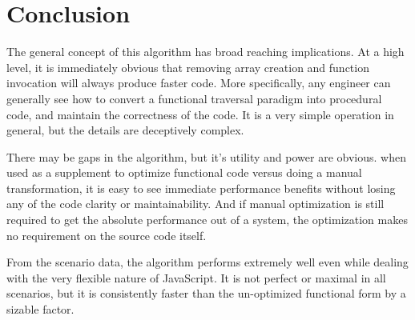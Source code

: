 \chapter{Conclusion}

The general concept of this algorithm has broad reaching implications.  At a high level, it is immediately obvious that removing array creation and function invocation will always produce faster code.  More specifically, any engineer can generally see how to convert a functional traversal paradigm into procedural code, and maintain the correctness of the code. It is a very simple operation in general, but the details are deceptively complex.

There may be gaps in the algorithm, but it's utility and power are obvious.  when used as a supplement to optimize functional code versus doing a manual transformation, it is easy to see immediate performance benefits without losing any of the code clarity or maintainability.  And if manual optimization is still required to get the absolute performance out of a system, the optimization makes no requirement on the source code itself.    

From the scenario data, the algorithm performs extremely well even while dealing with the very flexible nature of JavaScript. It is not perfect or maximal in all scenarios, but it is consistently faster than the un-optimized functional form by a sizable factor.

